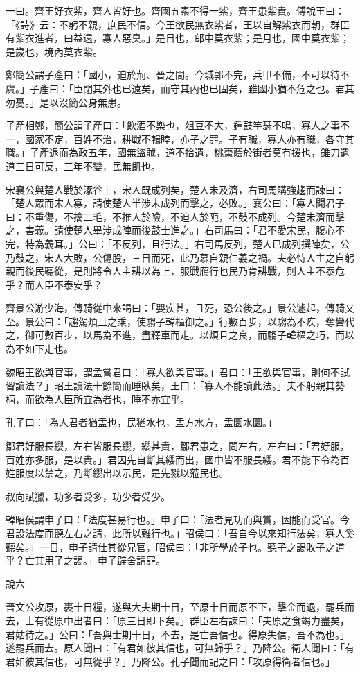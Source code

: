 \begin{pinyinscope}
一曰。齊王好衣紫，齊人皆好也。齊國五素不得一紫，齊王患紫貴。傅說王曰：「《詩》云：不躬不親，庶民不信。今王欲民無衣紫者，王以自解紫衣而朝，群臣有紫衣進者，曰益遠，寡人惡臭。」是日也，郎中莫衣紫；是月也，國中莫衣紫；是歲也，境內莫衣紫。

鄭簡公謂子產曰：「國小，迫於荊、晉之間。今城郭不完，兵甲不備，不可以待不虞。」子產曰：「臣閉其外也已遠矣，而守其內也已固矣，雖國小猶不危之也。君其勿憂。」是以沒簡公身無患。

子產相鄭，簡公謂子產曰：「飲酒不樂也，俎豆不大，鍾鼓竽瑟不鳴，寡人之事不一，國家不定，百姓不治，耕戰不輯睦，亦子之罪。子有職，寡人亦有職，各守其職。」子產退而為政五年，國無盜賊，道不拾遺，桃棗蔭於街者莫有援也，錐刀遺道三日可反，三年不變，民無飢也。

宋襄公與楚人戰於涿谷上，宋人既成列矣，楚人未及濟，右司馬購強趨而諫曰：「楚人眾而宋人寡，請使楚人半涉未成列而擊之，必敗。」襄公曰：「寡人聞君子曰：不重傷，不擒二毛，不推人於險，不迫人於阨，不鼓不成列。今楚未濟而擊之，害義。請使楚人畢涉成陣而後鼓士進之。」右司馬曰：「君不愛宋民，腹心不完，特為義耳。」公曰：「不反列，且行法。」右司馬反列，楚人已成列撰陣矣，公乃鼓之，宋人大敗，公傷股，三日而死，此乃慕自親仁義之禍。夫必恃人主之自躬親而後民聽從，是則將令人主耕以為上，服戰鴈行也民乃肯耕戰，則人主不泰危乎？而人臣不泰安乎？

齊景公游少海，傳騎從中來謁曰：「嬰疾甚，且死，恐公後之。」景公遽起，傳騎又至。景公曰：「趨駕煩且之乘，使騶子韓樞御之。」行數百步，以騶為不疾，奪轡代之，御可數百步，以馬為不進，盡釋車而走。以煩且之良，而騶子韓樞之巧，而以為不如下走也。

魏昭王欲與官事，謂孟嘗君曰：「寡人欲與官事。」君曰：「王欲與官事，則何不試習讀法？」昭王讀法十餘簡而睡臥矣，王曰：「寡人不能讀此法。」夫不躬親其勢柄，而欲為人臣所宜為者也，睡不亦宜乎。

孔子曰：「為人君者猶盂也，民猶水也，盂方水方，盂圜水圜。」

鄒君好服長纓，左右皆服長纓，纓甚貴，鄒君患之，問左右，左右曰：「君好服，百姓亦多服，是以貴。」君因先自斷其纓而出，國中皆不服長纓。君不能下令為百姓服度以禁之，乃斷纓出以示民，是先戮以蒞民也。

叔向賦獵，功多者受多，功少者受少。

韓昭侯謂申子曰：「法度甚易行也。」申子曰：「法者見功而與賞，因能而受官。今君設法度而聽左右之請，此所以難行也。」昭侯曰：「吾自今以來知行法矣，寡人奚聽矣。」一日，申子請仕其從兄官，昭侯曰：「非所學於子也。聽子之謁敗子之道乎？亡其用子之謁。」申子辟舍請罪。

說六

晉文公攻原，裹十日糧，遂與大夫期十日，至原十日而原不下，擊金而退，罷兵而去，士有從原中出者曰：「原三日即下矣。」群臣左右諫曰：「夫原之食竭力盡矣，君姑待之。」公曰：「吾與士期十日，不去，是亡吾信也。得原失信，吾不為也。」遂罷兵而去。原人聞曰：「有君如彼其信也，可無歸乎？」乃降公。衛人聞曰：「有君如彼其信也，可無從乎？」乃降公。孔子聞而記之曰：「攻原得衛者信也。」


\end{pinyinscope}
